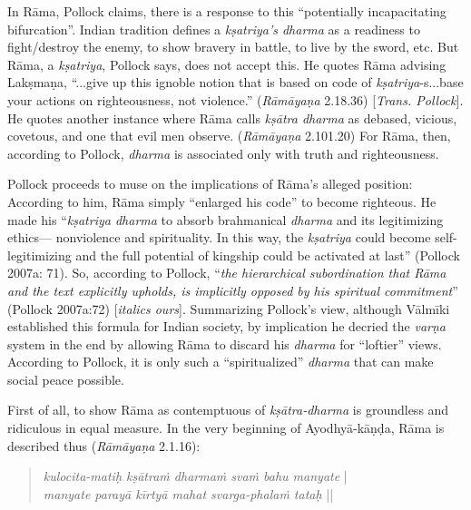 In Rāma, Pollock claims, there is a response to this “potentially incapacitating bifurcation”. Indian tradition defines a {\sl kṣatriya’s dharma} as a readiness to fight/destroy the enemy, to show bravery in battle, to live by the sword, etc. But Rāma, a {\sl kṣatriya}, Pollock says, does not accept this. He quotes Rāma advising Lakṣmaṇa, “...give up this ignoble notion that is based on code of {\sl kṣatriya}-s...base your actions on righteousness, not violence.” ({\sl Rāmāyaṇa} 2.18.36) [{\sl Trans. Pollock}]. He quotes another instance where Rāma calls {\sl kṣātra dharma} as debased, vicious, covetous, and one that evil men observe. ({\sl Rāmāyaṇa} 2.101.20) For Rāma, then, according to Pollock, {\sl dharma} is associated only with truth and righteousness.

Pollock proceeds to muse on the implications of Rāma’s alleged position: According to him, Rāma simply “enlarged his code” to become righteous. He made his “{\sl kṣatriya dharma} to absorb brahmanical {\sl dharma} and its legitimizing ethics--- nonviolence and spirituality. In this way, the {\sl kṣatriya} could become self-legitimizing and the full potential of kingship could be activated at last” (Pollock 2007a: 71). So, according to Pollock, “{\sl the hierarchical subordination that Rāma and the text explicitly upholds, is implicitly opposed by his spiritual commitment}” (Pollock 2007a:72) [{\sl italics ours}]. Summarizing Pollock's view, although Vālmīki established this formula for Indian society, by implication he decried the {\sl varṇa} system in the end by allowing Rāma to discard his {\sl dharma} for “loftier” views. According to Pollock, it is only such a “spiritualized” {\sl dharma} that can make social peace possible.

First of all, to show Rāma as contemptuous of {\sl kṣātra-dharma} is groundless and ridiculous in equal measure. In the very beginning of Ayodhyā-kāṇḍa, Rāma is described thus ({\sl Rāmāyaṇa} 2.1.16):
\begin{quote}
{{\sl kulocita-matiḥ kṣātraṁ dharmaṁ svaṁ bahu manyate}} |\\
{\sl manyate parayā kīrtyā mahat svarga-phalaṁ tataḥ} ||  
\end{quote}

